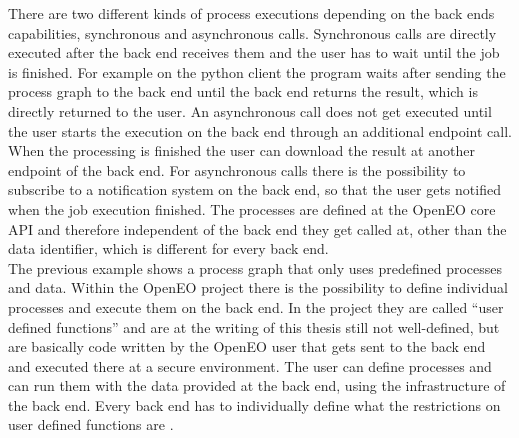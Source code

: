 \documentclass[draft,final]{vutinfth} %
\begin{document}
There are two different kinds of process executions depending on the back ends capabilities, synchronous and asynchronous calls. Synchronous calls are directly executed after the back end receives them and the user has to wait until the job is finished. For example on the python client the program waits after sending the process graph to the back end until the back end returns the result, which is directly returned to the user. An asynchronous call does not get executed until the user starts the execution on the back end through an additional endpoint call. When the processing is finished the user can download the result at another endpoint of the back end. For asynchronous calls there is the possibility to subscribe to a notification system on the back end, so that the user gets notified when the job execution finished.     
The processes are defined at the OpenEO core API and therefore independent of the back end they get called at, other than the data identifier, which is different for every back end.  
\\
The previous example shows a process graph that only uses predefined processes and data. Within the OpenEO project there is the possibility to define individual processes and execute them on the back end. In the project they are called “user defined functions” and are at the writing of this thesis still not well-defined, but are basically code written by the OpenEO user that gets sent to the back end and executed there at a secure environment. The user can define processes and can run them with the data provided at the back end, using the infrastructure of the back end. Every back end has to individually define what the restrictions on user defined functions are \cite{eodc_github}. 
\end{document}
